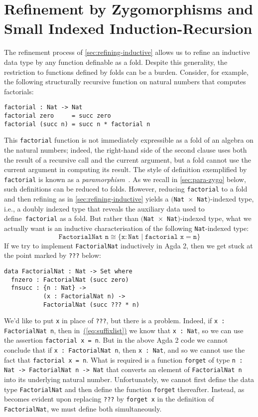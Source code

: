 \documentclass{LMCS}
\newcommand{\sepbar}{\mathrel|}
\newcommand{\parenref}[1]{\hyperref[#1]{(\ref*{#1})}}
\begin{document}
\section{Refinement by Zygomorphisms and Small Indexed
Induction-Recursion}\label{sec:zygo-refine}

The refinement process of \autoref{sec:refining-inductive} allows us
to refine an inductive data type by any function definable as a fold.
Despite this generality, the restriction to functions defined by folds
can be a burden. Consider, for example, the following structurally
recursive function on natural numbers that computes factorials:
\begin{verbatim}
factorial : Nat -> Nat
factorial zero     = succ zero
factorial (succ n) = succ n * factorial n
\end{verbatim}
This \verb|factorial| function is not immediately expressible as a
fold of an algebra on the natural numbers; indeed, the right-hand side
of the second clause uses both the result of a recursive call and the
current argument, but a fold cannot use the current argument in
computing its result. The style of definition exemplified by
\verb|factorial| is known as a
\emph{paramorphism}~\cite{meertens92paramorphism}. As we recall in
\autoref{sec:para-zygo} below, such definitions can be reduced to
folds. However, reducing \verb|factorial| to a fold and then refining
as in \autoref{sec:refining-inductive} yields a $($\texttt{Nat
  $\times$ Nat}$)$-indexed type, i.e., a doubly indexed type that
reveals the auxiliary data used to define~\texttt{factorial} as a
fold.  But rather than $($\texttt{Nat $\times$ Nat}$)$-indexed type,
what we actually want is an inductive characterisation of the
following \texttt{Nat}-indexed type:
\begin{equation}\label{eq:suffixlist}
  \texttt{FactorialNat n} \cong 
\{ \texttt{x} : \texttt{Nat} \sepbar \texttt{factorial x} = \texttt{n} \}
\end{equation}
If we try to implement \texttt{FactorialNat} inductively in Agda 2,
then we get stuck at the point marked by \texttt{???} below:
\begin{verbatim}
data FactorialNat : Nat -> Set where
  fnzero : FactorialNat (succ zero)
  fnsucc : {n : Nat} ->
           (x : FactorialNat n) ->
           FactorialNat (succ ??? * n)
\end{verbatim}
We'd like to put \verb|x| in place of \verb|???|, but there is a
problem. Indeed, if \verb|x : FactorialNat n|, then
in~\parenref{eq:suffixlist} we know that \verb|x : Nat|, so we can use
the assertion \verb|factorial x = n|.  But in the above Agda 2 code we
cannot conclude that if \verb|x : FactorialNat n|, then 
\verb|x : Nat|, and so we cannot use the fact that 
\verb|factorial x = n|. What is required is a function
{\tt forget} of type {\tt {n : Nat} -> FactorialNat n -> Nat} that
converts an element of \verb|FactorialNat n| into its underlying
natural number. Unfortunately, we cannot first define the data type
\verb|FactorialNat| and then define the function \verb|forget|
thereafter. Instead, as becomes evident upon replacing \verb|???| by
\verb|forget x| in the definition of \verb|FactorialNat|, we must
define both simultaneously.
\end{document}
